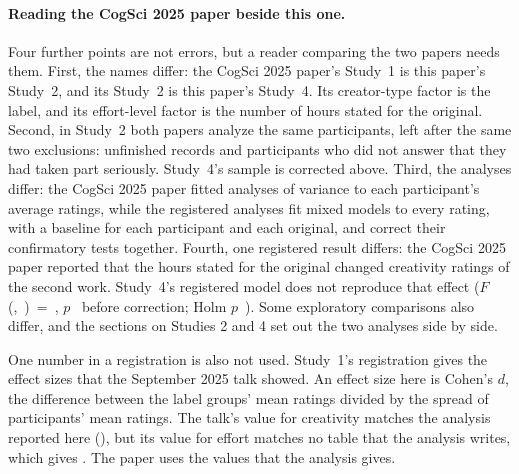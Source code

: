 \paragraph*{Reading the CogSci 2025 paper beside this one.}
Four further points are not errors, but a reader comparing the two papers needs them. First, the names differ: the CogSci 2025 paper's Study~1 is this paper's Study~2, and its Study~2 is this paper's Study~4. Its creator-type factor is the label, and its effort-level factor is the number of hours stated for the original. Second, in Study~2 both papers analyze the same \STwoN{} participants, left after the same two exclusions: \STwoNUnfinishedRemoved{} unfinished records and \STwoNNotSeriousRemoved{} participants who did not answer that they had taken part seriously. Study~4's sample is corrected above. Third, the analyses differ: the CogSci 2025 paper fitted analyses of variance to each participant's average ratings, while the registered analyses fit mixed models to every rating, with a baseline for each participant and each original, and correct their confirmatory tests together. Fourth, one registered result differs: the CogSci 2025 paper reported that the hours stated for the original changed creativity ratings of the second work. Study~4's registered model does not reproduce that effect ($F$(\SFourCreatSourceTimeDfNum,~\SFourCreatSourceTimeDfDen)~=~\SFourCreatSourceTimeF, $p$~\SFourCreatSourceTimeP{} before correction; Holm $p$~\SFourCreatSourceTimePHolm). Some exploratory comparisons also differ, and the sections on Studies 2 and 4 set out the two analyses side by side.

One number in a registration is also not used. Study~1's registration gives the effect sizes that the September 2025 talk showed. An effect size here is Cohen's $d$, the difference between the label groups' mean ratings divided by the spread of participants' mean ratings. The talk's value for creativity matches the analysis reported here (\SOneDCreat), but its value for effort matches no table that the analysis writes, which gives \SOneDEff. The paper uses the values that the analysis gives.
